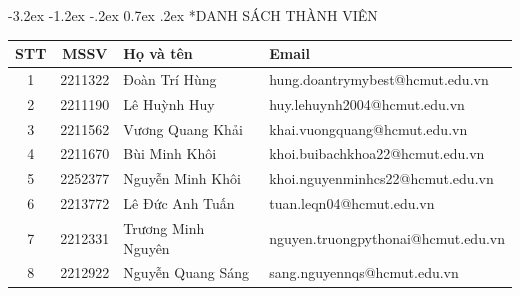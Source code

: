 \documentclass[12pt]{article}
\makeatletter
\renewcommand\section{\@startsection{section}{1}{\z@}%
                                     {-3.2ex \@plus -1.2ex \@minus -.2ex}%
                                     {0.7ex \@plus .2ex}%
                                     {\normalfont\Large\bfseries}}
\makeatother
\begin{document}
\clearpage
{}

\section*{DANH SÁCH THÀNH VIÊN}

\begin{table}[h]
    \centering
    \renewcommand{\arraystretch}{1.5}
    \begin{tabular}{|c|c|l|l|}
        \hline
        \textbf{STT} & \textbf{MSSV} & \textbf{Họ và tên} & \textbf{Email} \\ \hline
        1 & 2211322 & Đoàn Trí Hùng & hung.doantrymybest@hcmut.edu.vn \\ \hline
        2 & 2211190 & Lê Huỳnh Huy & huy.lehuynh2004@hcmut.edu.vn \\ \hline
        3 & 2211562 & Vương Quang Khải & khai.vuongquang@hcmut.edu.vn \\ \hline
        4 & 2211670 & Bùi Minh Khôi & khoi.buibachkhoa22@hcmut.edu.vn \\ \hline
        5 & 2252377 & Nguyễn Minh Khôi & khoi.nguyenminhcs22@hcmut.edu.vn \\ \hline
        6 & 2213772 & Lê Đức Anh Tuấn & tuan.leqn04@hcmut.edu.vn \\ \hline
        7 & 2212331 & Trương Minh Nguyên & nguyen.truongpythonai@hcmut.edu.vn \\ \hline
        8 & 2212922 & Nguyễn Quang Sáng & sang.nguyennqs@hcmut.edu.vn \\ \hline
    \end{tabular}
\end{table}

\newpage

\clearpage
\begingroup
{}
\setlength{\parskip}{0pt}
\thispagestyle{empty}      %
\tableofcontents
\endgroup
\clearpage

\begingroup
{}
\setlength{\parskip}{0pt}
\thispagestyle{empty}      %
\listoffigures
\endgroup
{}
\clearpage

\begingroup
{}
\setlength{\parskip}{0pt}
\thispagestyle{empty}      %
\listoftables
\endgroup
{}
\clearpage
\end{document}
